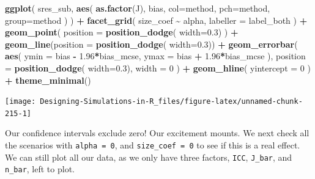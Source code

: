 \documentclass[
]{book}
\newenvironment{Shaded}{\begin{snugshade}}{\end{snugshade}}
\newcommand{\AttributeTok}[1]{\textcolor[rgb]{0.13,0.29,0.53}{#1}}
\newcommand{\DecValTok}[1]{\textcolor[rgb]{0.00,0.00,0.81}{#1}}
\newcommand{\FloatTok}[1]{\textcolor[rgb]{0.00,0.00,0.81}{#1}}
\newcommand{\FunctionTok}[1]{\textcolor[rgb]{0.13,0.29,0.53}{\textbf{#1}}}
\newcommand{\NormalTok}[1]{#1}
\newcommand{\SpecialCharTok}[1]{\textcolor[rgb]{0.81,0.36,0.00}{\textbf{#1}}}
\begin{document}
\begin{Shaded}
\begin{Highlighting}[]
\FunctionTok{ggplot}\NormalTok{( sres\_sub, }\FunctionTok{aes}\NormalTok{( }\FunctionTok{as.factor}\NormalTok{(J), bias, }
                       \AttributeTok{col=}\NormalTok{method, }\AttributeTok{pch=}\NormalTok{method, }\AttributeTok{group=}\NormalTok{method ) ) }\SpecialCharTok{+}
  \FunctionTok{facet\_grid}\NormalTok{( size\_coef }\SpecialCharTok{\textasciitilde{}}\NormalTok{ alpha, }\AttributeTok{labeller =}\NormalTok{ label\_both ) }\SpecialCharTok{+}
  \FunctionTok{geom\_point}\NormalTok{( }\AttributeTok{position =} \FunctionTok{position\_dodge}\NormalTok{( }\AttributeTok{width=}\FloatTok{0.3}\NormalTok{) ) }\SpecialCharTok{+}
  \FunctionTok{geom\_line}\NormalTok{(}\AttributeTok{position =} \FunctionTok{position\_dodge}\NormalTok{( }\AttributeTok{width=}\FloatTok{0.3}\NormalTok{)) }\SpecialCharTok{+}
  \FunctionTok{geom\_errorbar}\NormalTok{( }\FunctionTok{aes}\NormalTok{( }\AttributeTok{ymin =}\NormalTok{ bias }\SpecialCharTok{{-}} \FloatTok{1.96}\SpecialCharTok{*}\NormalTok{bias\_mcse,}
                      \AttributeTok{ymax =}\NormalTok{ bias }\SpecialCharTok{+} \FloatTok{1.96}\SpecialCharTok{*}\NormalTok{bias\_mcse ),}
                 \AttributeTok{position =} \FunctionTok{position\_dodge}\NormalTok{( }\AttributeTok{width=}\FloatTok{0.3}\NormalTok{),}
                 \AttributeTok{width =} \DecValTok{0}\NormalTok{ ) }\SpecialCharTok{+}
  \FunctionTok{geom\_hline}\NormalTok{( }\AttributeTok{yintercept =} \DecValTok{0}\NormalTok{ ) }\SpecialCharTok{+}
  \FunctionTok{theme\_minimal}\NormalTok{() }
\end{Highlighting}
\end{Shaded}

\begin{center}\texttt{[image: Designing-Simulations-in-R\_files/figure-latex/unnamed-chunk-215-1]} \end{center}

Our confidence intervals exclude zero!
Our excitement mounts.
We next check all the scenarios with \texttt{alpha\ =\ 0}, and \texttt{size\_coef\ =\ 0} to see if this is a real effect.
We can still plot all our data, as we only have three factors, \texttt{ICC}, \texttt{J\_bar}, and \texttt{n\_bar}, left to plot.
\end{document}
